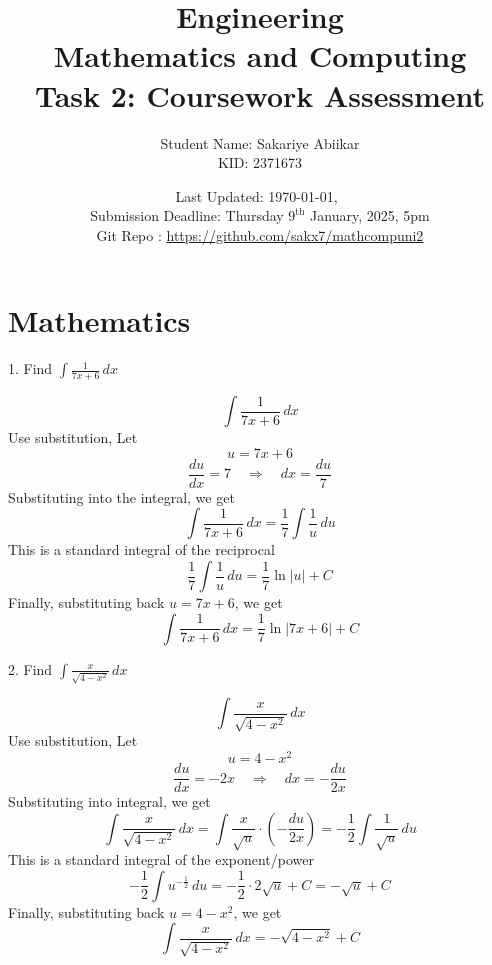 \documentclass[a4paper, 12pt]{report}
\title{\vspace{3em} \Huge \textbf{Engineering\\ Mathematics and Computing}\\ \vspace{1em} \Large Task 2: Coursework Assessment}
\author{Student Name: Sakariye Abiikar\\ KID: 2371673}
\date{Last Updated: \today,\
     \currenttime\\ Submission Deadline: Thursday \(9^{\text{th}}\) January, 2025, 5pm \\[1em] Git Repo : \color{blue}\url{https://github.com/sakx7/mathcompuni2}}
\def\ni{green!60!black!40!white}
\begin{document}
    
    \maketitle
    \thispagestyle{empty}
    
    \newpage
    \thispagestyle{empty}
    
    \chapter{Mathematics}
    
    \newpage\centering\restoregeometry
    
    \setcounter{page}{1}
    
    
    \begin{tcolorbox}[title={\color{black}\section{Q1}}, colback=white, colframe=\ni, boxrule=1mm, width=1\textwidth]
        1. Find \( \int \frac{1}{7x + 6} \, dx \)
    \end{tcolorbox}
    \[\int \frac{1}{7x + 6} \, dx\]
    Use substitution, Let 
    \[u = 7x + 6\]
    \[\frac{du}{dx} = 7 \quad \Rightarrow \quad dx = \frac{du}{7}\]
    Substituting into the integral, we get
    \[\int \frac{1}{7x + 6} \, dx = \frac{1}{7} \int \frac{1}{u} \, du\]
    This is a standard integral of the reciprocal
    \[\frac{1}{7} \int \frac{1}{u} \, du = \frac{1}{7} \ln |u| + C\]
    Finally, substituting back \( u = 7x + 6 \), we get
    \[\boxed{\int \frac{1}{7x + 6} \, dx = \frac{1}{7} \ln |7x + 6| + C}\]
    
    
    \newpage
    
    \begin{tcolorbox}[title={\color{black}\section{Q2}}, colback=white, colframe=\ni, boxrule=1mm, width=1\textwidth]
        2. Find \( \int \frac{x}{\sqrt{4 - x^2}} \, dx \)
    \end{tcolorbox}
    
    \[\int \frac{x}{\sqrt{4 - x^2}} \, dx\]
    Use substitution, Let\\[-1.5em] 
    \[u = 4 - x^2\]
    \[\frac{du}{dx} = -2x \quad \Rightarrow \quad dx = -\frac{du}{2x}\]
    Substituting into integral, we get
    \[\int \frac{x}{\sqrt{4 - x^2}} \, dx = \int \frac{x}{\sqrt{u}} \cdot \left(-\frac{du}{2x}\right) = -\frac{1}{2} \int \frac{1}{\sqrt{u}} \, du\]
    This is a standard integral of the exponent/power
    \[-\frac{1}{2} \int u^{-\frac{1}{2}} \, du = -\frac{1}{2} \cdot 2 \sqrt{u} + C = -\sqrt{u} + C\]
    Finally, substituting back \( u = 4 - x^2 \), we get
    \[\boxed{\int \frac{x}{\sqrt{4 - x^2}} \, dx = -\sqrt{4 - x^2} + C}\]
    
\end{document}
